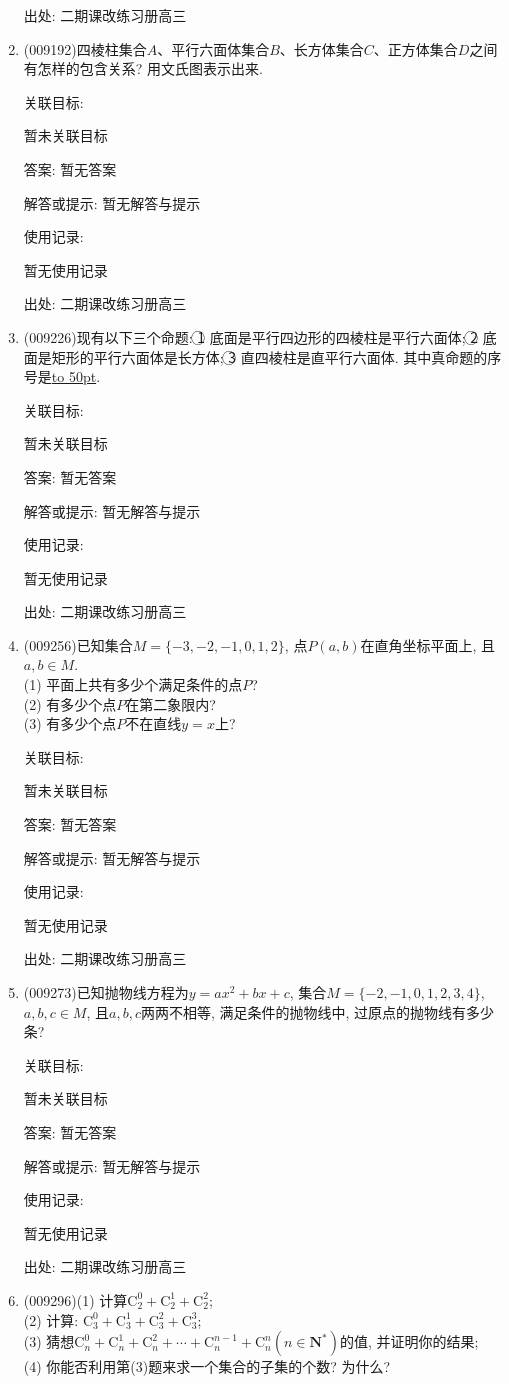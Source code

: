 \documentclass[10pt,a4paper]{article}
\newcommand{\blank}[1]{\underline{\hbox to #1pt{}}}
\begin{document}
\begin{enumerate}[1.]
出处: 二期课改练习册高三
\item { (009192)}四棱柱集合$A$、平行六面体集合$B$、长方体集合$C$、正方体集合$D$之间有怎样的包含关系? 用文氏图表示出来.


关联目标:

暂未关联目标

答案: 暂无答案

解答或提示: 暂无解答与提示

使用记录:

暂无使用记录


出处: 二期课改练习册高三
\item { (009226)}现有以下三个命题: \textcircled{1} 底面是平行四边形的四棱柱是平行六面体; \textcircled{2} 底面是矩形的平行六面体是长方体; \textcircled{3} 直四棱柱是直平行六面体. 其中真命题的序号是\blank{50}.


关联目标:

暂未关联目标

答案: 暂无答案

解答或提示: 暂无解答与提示

使用记录:

暂无使用记录


出处: 二期课改练习册高三
\item { (009256)}已知集合$M=\{-3,-2,-1,0,1,2\}$, 点$P(a,b) $在直角坐标平面上, 且$a, b\in M$.\\
(1) 平面上共有多少个满足条件的点$P$?\\
(2) 有多少个点$P$在第二象限内?\\
(3) 有多少个点$P$不在直线$y=x$上?


关联目标:

暂未关联目标

答案: 暂无答案

解答或提示: 暂无解答与提示

使用记录:

暂无使用记录


出处: 二期课改练习册高三
\item { (009273)}已知抛物线方程为$y=ax^2+bx+c$, 集合$M=\{-2,-1,0,1,2,3,4\}$, $a,b,c\in M$, 且$a,b,c$两两不相等, 满足条件的抛物线中, 过原点的抛物线有多少条?


关联目标:

暂未关联目标

答案: 暂无答案

解答或提示: 暂无解答与提示

使用记录:

暂无使用记录


出处: 二期课改练习册高三
\item { (009296)}(1) 计算$\mathrm{C}_2^0+\mathrm{C}_2^1+\mathrm{C}_2^2$;\\
(2) 计算: $\mathrm{C}_3^0+\mathrm{C}_3^1+\mathrm{C}_3^2+\mathrm{C}_3^3$;\\
(3) 猜想$\mathrm{C}_n^0+\mathrm{C}_n^1+\mathrm{C}_n^2+\cdots +\mathrm{C}_n^{n-1}+\mathrm{C}_n^n(n\in \mathbf{N}^*) $的值, 并证明你的结果;\\
(4) 你能否利用第(3)题来求一个集合的子集的个数? 为什么?



\end{enumerate}
\end{document}
